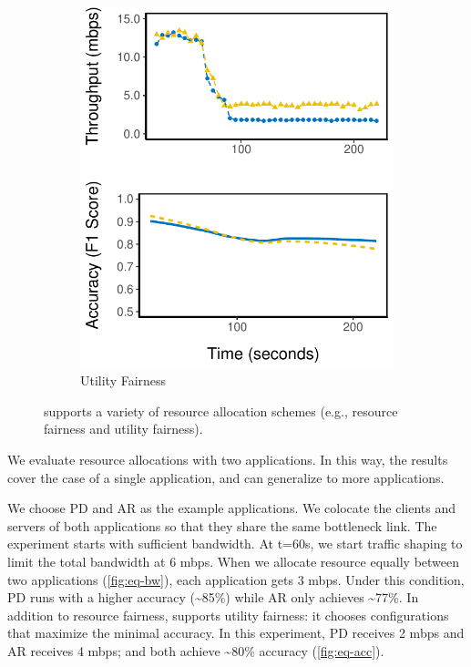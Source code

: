 \begin{figure}
\begin{subfigure}[t]{0.49\columnwidth}
    \includegraphics[width=\textwidth]{figures/multitask-eq-acc.pdf}
    \caption{Utility Fairness}
    \label{fig:eq-acc}
  \end{subfigure}
  \caption{\sysname{} supports a variety of resource allocation schemes (e.g., resource fairness and utility fairness).}
  \label{fig:multitask}
\end{figure}

We evaluate resource allocations with two applications. In this way, the results
cover the case of a single application, and can generalize to more applications.

We choose PD and AR as the example applications.
We colocate the clients and servers of both applications so that they
share the same bottleneck link. The experiment starts with sufficient
bandwidth. At t=60s, we start traffic shaping to limit the total bandwidth
at 6 mbps. When we allocate resource equally between two applications
(\autoref{fig:eq-bw}), each application gets 3 mbps. Under this condition,
PD runs with a higher accuracy (\textasciitilde 85\%) while AR only achieves
\textasciitilde 77\%. In addition to resource fairness, \sysname{} supports utility fairness: it
chooses configurations that maximize the minimal accuracy. In this experiment,
PD receives 2 mbps and AR receives 4 mbps; and both achieve \textasciitilde 80\%
accuracy (\autoref{fig:eq-acc}).


